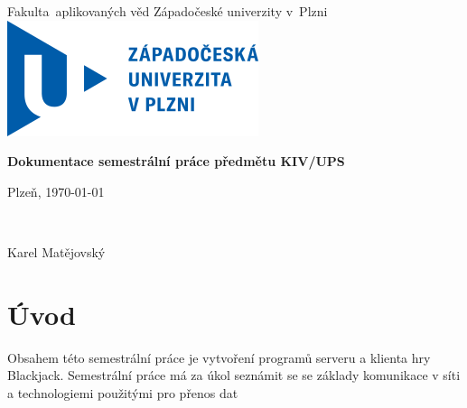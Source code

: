 \documentclass[12pt]{article}
\begin{document}
\begin{titlepage}
   \begin{center}
        {\large Fakulta~aplikovaných věd Západočeské univerzity v~Plzni}
        \vspace{1cm}
        \includegraphics{zcu-logo.png}
         \vspace{1.5cm}\par
        {\Huge
       \textbf{Dokumentace semestrální práce předmětu KIV/UPS}
		\par}
		\vfill
       \vspace{0.8cm}
      \begin{minipage}{0.4\textwidth}
            \begin{flushleft}
                \large
                Plzeň, \today
                
            \end{flushleft}
        \end{minipage}
        ~
        \begin{minipage}{0.4\textwidth}
            \begin{flushright}
               Karel Matějovský
            \end{flushright}
        \end{minipage}
            
   \end{center}
\end{titlepage}

\tableofcontents
\newpage
\section{Úvod}
Obsahem této semestrální práce je vytvoření programů serveru a klienta hry Blackjack. Semestrální práce má za úkol seznámit se se základy komunikace v síti a technologiemi použitými pro přenos dat

\newpage
\end{document}
